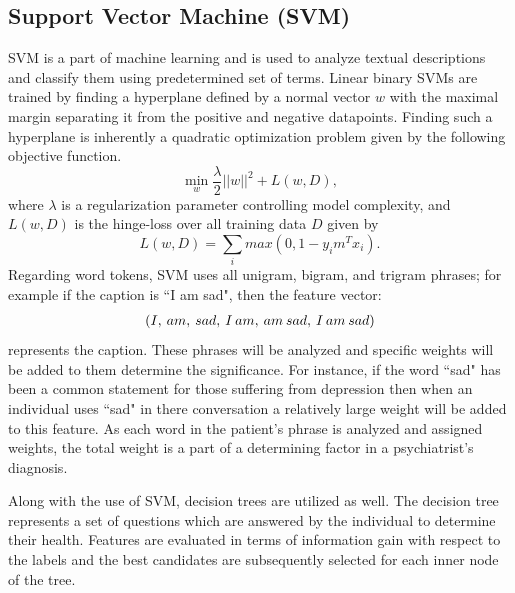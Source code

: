 \documentclass[11pt,technote,twocolumn]{IEEEtran}
\begin{document}
\subsection{Support Vector Machine (SVM)}
SVM is a part of machine learning and is used to analyze textual descriptions and classify them using predetermined set of terms. Linear binary SVMs are trained by finding a hyperplane defined by a normal vector $w$ with the maximal margin separating it from the positive and negative datapoints. Finding such a hyperplane is inherently a quadratic optimization problem given by the following objective function.\cite{Sadilek:2013:MIL:2433396.2433476}  
\begin{equation}\tag{6}
    \min\limits_{w} \frac{\lambda}{2} ||w||^2 + L(w,D),
\end{equation}
where $\lambda$ is a regularization parameter controlling model complexity, and $L(w, D)$ is the hinge-loss over all training data $D$ given by
\begin{equation}\tag{7}
    L(w,D) = \sum_i max(0,1 - y_{i}m^{T}x_{i}).
\end{equation}
Regarding word tokens, SVM uses all unigram, bigram, and trigram phrases; for example if the caption is ``I am sad", then the feature vector:
\begin{align*}
(I, \hspace{.7mm}am, \hspace{.7mm}sad, \hspace{.7mm}I \hspace{.7mm}am, \hspace{.7mm}am \hspace{.7mm}sad, \hspace{.7mm}I \hspace{.7mm}am \hspace{.7mm}sad)
\end{align*}
represents the caption. These phrases will be analyzed and specific weights will be added to them determine the significance. For instance, if the word ``sad" has been a common statement for those suffering from depression then when an individual uses ``sad" in there conversation a relatively large weight will be added to this feature. As each word in the patient's phrase is analyzed and assigned weights, the total weight is a part of a determining factor in a psychiatrist's diagnosis.
\par
Along with the use of SVM, decision trees are utilized as well. The decision tree represents a set of questions which are answered by the individual to determine their health.  Features are evaluated in terms of information gain with respect to the labels and the best candidates are subsequently selected for each inner node of the tree. \cite{Sadilek:2013:MIL:2433396.2433476}
\end{document}
